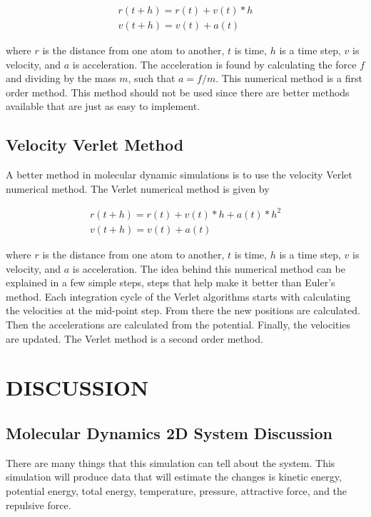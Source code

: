 \documentclass[reprint,amsmath,amssymb, aps, 10pt, a4paper, english, reqno]{revtex4-1}
\begin{document}
\begin{multicols}{2}
\begin{align}
    r(t + h) = r(t) + v(t)*h \\
    v(t + h) = v(t) + a(t)    
\end{align}


where $r$ is the distance from one atom to another, $t$ is time, $h$ is a time step, $v$ is velocity, and $a$ is acceleration. The acceleration is found by calculating the force $f$ and dividing by the mass $m$, such that $a = f/m$. This numerical method is a first order method. This method should not be used since there are better methods available that are just as easy to implement. 

\subsection{Velocity Verlet Method}

A better method in molecular dynamic simulations is to use the velocity Verlet numerical method. The Verlet numerical method is given by 

\begin{align}
    r(t + h) = r(t) + v(t)*h + a(t)*h^{2}\\
    v(t + h) = v(t) + a(t)
\end{align}

where $r$ is the distance from one atom to another, $t$ is time, $h$ is a time step, $v$ is velocity, and $a$ is acceleration. The idea behind this numerical method can be explained in a few simple steps, steps that help make it better than Euler's method. Each integration cycle of the Verlet algorithms starts with calculating the velocities at the mid-point step. From there the new positions are calculated. Then the accelerations are calculated from the potential. Finally, the velocities are updated. The Verlet method is a second order method. 
    

\section{\label{sec:level3}DISCUSSION} 

\subsection{Molecular Dynamics 2D System Discussion}

There are many things that this simulation can tell about the system. This simulation will produce data that will estimate the changes is kinetic energy, potential energy, total energy, temperature, pressure, attractive force, and the repulsive force. \\


\end{multicols}
\end{document}

